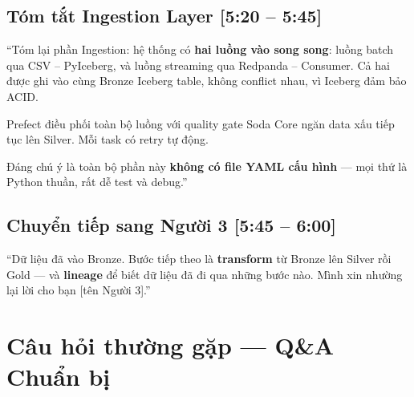 \documentclass[12pt, a4paper]{article}
\newenvironment{speakerbox}[2]{%
  \begin{tcolorbox}[
    enhanced, breakable,
    colback=#1!6!white, colframe=#1,
    colbacktitle=#1, coltitle=white,
    fonttitle=\bfseries\large,
    title={#2},
    arc=4pt, boxrule=1.5pt,
    left=8pt, right=8pt, top=6pt, bottom=6pt,
  ]
}{\end{tcolorbox}}
\newcommand{\timing}[1]{\hfill{\small\bfseries\color{gray}[#1]}}
\begin{document}
\begin{speakerbox}{p2color}{\faUser\ Người 2 \textbullet\ 5:20 -- 6:00 \textbullet\ Tổng kết}

\subsection*{Tóm tắt Ingestion Layer \timing{5:20 -- 5:45}}

\begin{scriptbox}
``Tóm lại phần Ingestion: hệ thống có \textbf{hai luồng vào song song}:
luồng batch qua CSV -- PyIceberg, và luồng streaming qua Redpanda -- Consumer.
Cả hai được ghi vào cùng Bronze Iceberg table, không conflict nhau,
vì Iceberg đảm bảo ACID.

Prefect điều phối toàn bộ luồng với quality gate Soda Core ngăn
data xấu tiếp tục lên Silver. Mỗi task có retry tự động.

Đáng chú ý là toàn bộ phần này \textbf{không có file YAML cấu
hình} --- mọi thứ là Python thuần, rất dễ test và debug.''
\end{scriptbox}

\subsection*{Chuyển tiếp sang Người 3 \timing{5:45 -- 6:00}}

\begin{scriptbox}
``Dữ liệu đã vào Bronze. Bước tiếp theo là \textbf{transform} từ
Bronze lên Silver rồi Gold --- và \textbf{lineage} để biết dữ liệu
đã đi qua những bước nào. Mình xin nhường lại lời cho bạn [tên Người 3].''
\end{scriptbox}

\end{speakerbox}

\newpage

\section{Câu hỏi thường gặp --- Q\&A Chuẩn bị}
\end{document}
